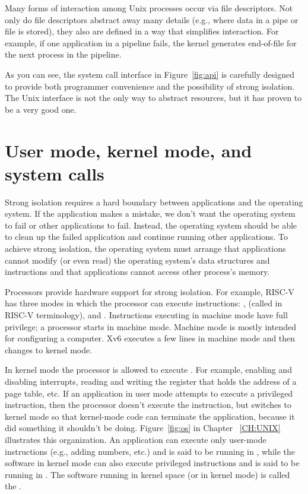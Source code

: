 Many forms of interaction among Unix processes occur via file descriptors.
Not only do file descriptors abstract away many details (e.g.,
where data in a pipe or file is stored), they also are defined in a
way that simplifies interaction.
For example, if one application in a pipeline fails, the kernel
generates end-of-file for the next process in the pipeline.

As you can see, the system call interface in
Figure~\ref{fig:api}
is carefully designed to provide both programmer convenience and
the possibility of strong isolation.  The Unix interface
is not the only way to abstract resources, but it has proven to be a very good
one.

\section{User mode, kernel mode, and system calls}

Strong isolation requires a hard boundary between applications and the operating
system.  If the application makes a mistake, we don't want the operating system
to fail or other applications to fail. Instead, the operating system should be
able to clean up the failed application and continue running other applications.
To achieve strong isolation, the operating system must arrange that applications cannot modify (or even
read) the operating system's data structures and instructions and that
applications cannot access other process's memory.

Processors provide hardware support for strong isolation.   For
example, RISC-V has three modes in which
the processor can execute instructions:
,
(called
in RISC-V terminology), and
.
Instructions executing in machine mode have full privilege; a
processor starts in machine mode.  Machine mode is mostly intended for
configuring a computer.  Xv6 executes a few lines in machine mode and
then changes to kernel mode.

In kernel mode the processor is allowed to execute 
.
For example, enabling and disabling interrupts,  reading and writing
the register that holds the address of a page table, etc.
If an application in user mode attempts to execute
a privileged instruction, then the processor doesn't execute the instruction, but switches
to kernel mode so that kernel-mode code can terminate the application,
because it did something it shouldn't be doing. 
Figure~\ref{fig:os}
in Chapter ~\ref{CH:UNIX} illustrates this organization.  An application can
execute only user-mode instructions (e.g., adding numbers, etc.) and is said to
be running in 
,
while the software in kernel mode can also execute privileged instructions and
is said to be running in
.
The software running in kernel space (or in kernel mode) is called
the
.

